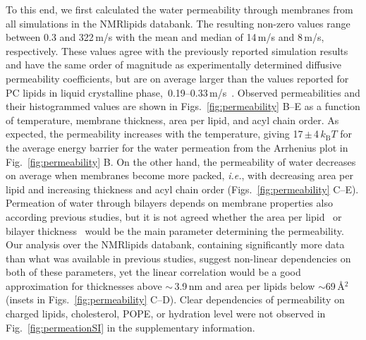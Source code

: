 \documentclass[fleqn,10pt]{wlscirep}
\begin{document}
To this end, we first calculated the water permeability through membranes from all simulations in the NMRlipids databank. The resulting non-zero values range between 0.3 and 322\,\textmu{}m/s with the mean and median of 14\,\textmu{}m/s and 8\,\textmu{}m/s, respectively. These values agree with the previously reported simulation results~\cite{venable19,camilo2022} and have the same order of magnitude as experimentally determined diffusive permeability coefficients, but are on average larger than the values reported for PC lipids in liquid crystalline phase,~0.19--0.33\,\textmu{}m/s~\cite{jansen95}. Observed permeabilities and their histogrammed values are shown in Figs.~\ref{fig:permeability} B--E as a function of temperature, membrane thickness, area per lipid, and acyl chain order.  
As expected, the permeability increases with the temperature, giving 17\,$\pm$\,4\,$k_\mathrm{B}T$ for the average energy barrier for the water permeation from the Arrhenius plot in Fig.~\ref{fig:permeability} B. On the other hand, the permeability of water decreases on average when membranes become more packed, \textit{i.e.}, with decreasing area per lipid and increasing thickness and acyl chain order (Figs.~\ref{fig:permeability} C--E). Permeation of water through bilayers depends on membrane properties also according previous studies, but it is not agreed whether the area per lipid~\cite{nagle08} or bilayer thickness~\cite{frallicciardi22} would be the main parameter determining the permeability. 
Our analysis over the NMRlipids databank, containing significantly more data than what was available in previous studies, suggest non-linear dependencies on both of these parameters, yet the linear correlation would be a good approximation for thicknesses above $\sim$\,3.9\,nm and area per lipids below $\sim$69\,\AA{}$^2$ (insets in Figs.~\ref{fig:permeability} C--D).
Clear dependencies of permeability on charged lipids, cholesterol, POPE, or hydration level were not observed in Fig.~\ref{fig:permeationSI} in the supplementary information.
%
%
%
\end{document}
